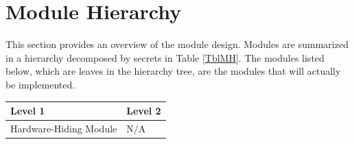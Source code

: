 \documentclass[12pt, titlepage]{article}
\begin{document}
\section{Module Hierarchy} \label{SecMH}

This section provides an overview of the module design. Modules are summarized
in a hierarchy decomposed by secrets in Table \ref{TblMH}. The modules listed
below, which are leaves in the hierarchy tree, are the modules that will
actually be implemented.

\begin{table}[h!]
\centering
\begin{tabular}{p{} p{}}
\toprule
\textbf{Level 1} & \textbf{Level 2}\\
\midrule

{Hardware-Hiding Module} & N/A\\
\midrule


\end{tabular}
\end{table}
\end{document}
